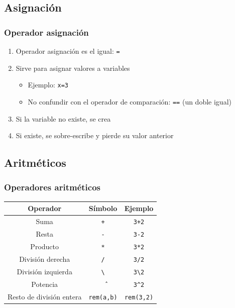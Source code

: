 \subsection{Asignación}
\begin{frame}[label=oper_asignacion]
 \frametitle{Operador asignación}
 \begin{enumerate}
 \item Operador asignación es el igual: \alert{\texttt{=}}
 \item Sirve para asignar valores a variables
  \begin{itemize}
   \item Ejemplo: \texttt{x=3}
   \item \alert{No confundir} con el operador de comparación:
        \alert{\texttt{==}} (un doble igual)
  \end{itemize}
 \item Si la variable no existe, se \alert{crea}
 \item Si existe, se \alert{sobre-escribe} y \alert{pierde} su valor anterior
 \end{enumerate}
\end{frame}
\subsection{Aritméticos}
\begin{frame}[label=oper_aritmeticos]
 \frametitle{Operadores aritméticos}
 \begin{center}
 \begin{small}
  \begin{tabular}{|c|c|c|}
  \multicolumn{1}{c}{Operador} & \multicolumn{1}{c}{Símbolo} &
       \multicolumn{1}{c}{Ejemplo} \\ \toprule \hline
  Suma & \texttt{+} & \texttt{3+2} \\ \hline
  Resta & \texttt{-} & \texttt{3-2} \\ \hline
  Producto & \texttt{*} & \texttt{3*2} \\ \hline
  División derecha & \texttt{/} & \texttt{3/2} \\ \hline
  División izquierda & \texttt{\textbackslash} & \texttt{3\textbackslash 2} \\
\hline
  Potencia & \texttt{\^\ } & \texttt{3\^{}2} \\ \hline
  Resto de división entera & \texttt{rem(a,b)} & \texttt{rem(3,2)} \\
\hline
  \end{tabular}
 \end{small}
 \end{center}
\end{frame}
